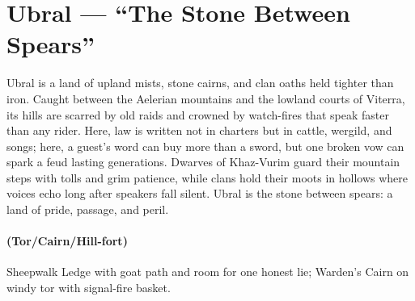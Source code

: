 \section{Ubral --- ``The Stone Between Spears''}
\label{chap:ubral}

\begin{tcolorbox}[colback=black!3,colframe=black!40!white,title={Theme \& Atmosphere}]
Ubral is a land of upland mists, stone cairns, and clan oaths held tighter than iron. Caught between the Aelerian mountains and the lowland courts of Viterra, its hills are scarred by old raids and crowned by watch-fires that speak faster than any rider. Here, law is written not in charters but in cattle, wergild, and songs; here, a guest's word can buy more than a sword, but one broken vow can spark a feud lasting generations. Dwarves of Khaz-Vurim guard their mountain steps with tolls and grim patience, while clans hold their moots in hollows where voices echo long after speakers fall silent. Ubral is the stone between spears: a land of pride, passage, and peril.
\end{tcolorbox}

\paragraph*{(Tor/Cairn/Hill-fort)} Sheepwalk Ledge with goat path and room for one honest lie; Warden's Cairn on windy tor with signal-fire basket.


